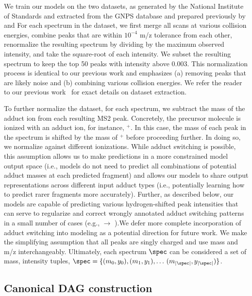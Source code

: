 \documentclass[journal=jcim,manuscript=article]{achemso}
\begin{document}
We train our models on the two datasets, \nistData \cite{noauthor_tandem_nodate} as generated by the National Institute of Standards  and \gnpsData extracted from the GNPS database \cite{wang_sharing_2016} and prepared previously by \citeauthor{duhrkop_systematic_2021}\cite{duhrkop_systematic_2021} and  \citeauthor{Goldman2023annotating}\cite{Goldman2023annotating} For each spectrum in the dataset, we first merge all scans at various collision energies, combine peaks that are within $10^{-4}$ m/z tolerance from each other, renormalize the resulting spectrum by dividing by the maximum observed intensity, and take the square-root of each intensity. We subset the resulting spectrum to keep the top 50 peaks with intensity above $0.003$. This normalization process is identical to our previous work \cite{goldman_prefix-tree_2023} and emphasizes (a) removing peaks that are likely noise and (b) combining various collision energies. We refer the reader to our previous work~\cite{goldman_prefix-tree_2023} for exact details on dataset extraction. 

To further normalize the dataset, for each spectrum, we subtract the mass of the adduct ion from each resulting MS2 peak. Concretely, the precursor molecule is ionized with an adduct ion, for instance, $^+$. In this case, the mass of each peak in the spectrum is shifted by the mass of $^+$ before proceeding further. In doing so, we normalize against different ionizations. While adduct switching is possible, this assumption allows us to make predictions in a more constrained model output space (i.e., models do not need to predict all combinations of potential adduct masses at each predicted fragment) and allows our models to share output representations across different input adduct types (i.e., potentially learning how to predict rarer fragments more accurately). Further, as described below, our models are capable of predicting various hydrogen-shifted peak intensities that can serve to regularize and correct wrongly annotated adduct switching patterns in a small number of cases (e.g., \ce{[M{+}H]+} $\rightarrow$ \ce{[M]+}).We defer more complete incorporation of adduct switching into modeling as a potential direction for future work. We make the simplifying assumption that all peaks are singly charged and use mass and m/z interchangeably.  Ultimately, each spectrum $\spec$ can be considered a set of mass, intensity tuples, $\spec = \{(m_0, y_0), (m_1, y_1), \dots\, (m_{|\spec|}, y_{|\spec|})\}$.

\subsection{Canonical DAG construction}
\label{sec:methods_dag}
\end{document}
